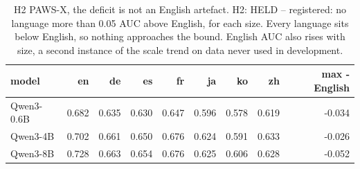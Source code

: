 \begin{table}[t]
\centering
\small
\caption{H2  PAWS-X, the deficit is not an English artefact. H2: HELD -- registered: no language more than 0.05 AUC above English, for each size. Every language sits below English, so nothing approaches the bound. English AUC also rises with size, a second instance of the scale trend on data never used in development.}
\begin{tabular}{lrrrrrrrr}
\toprule
model & en & de & es & fr & ja & ko & zh & max - English \\
\midrule
Qwen3-0.6B & 0.682 & 0.635 & 0.630 & 0.647 & 0.596 & 0.578 & 0.619 & -0.034 \\
Qwen3-4B & 0.702 & 0.661 & 0.650 & 0.676 & 0.624 & 0.591 & 0.633 & -0.026 \\
Qwen3-8B & 0.728 & 0.663 & 0.654 & 0.676 & 0.625 & 0.606 & 0.628 & -0.052 \\
\bottomrule
\end{tabular}
\end{table}
